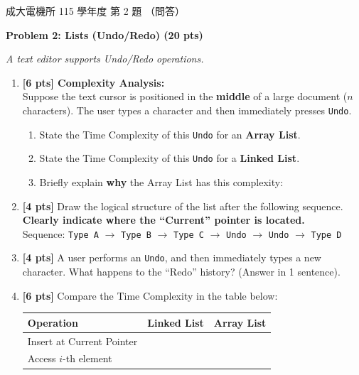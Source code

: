 \begin{pastexam}[label={px:ncku-115-ee-ds-02}]{成大電機所 115 學年度 第 2 題}
（問答）

\textbf{Problem 2: Lists (Undo/Redo) (20 pts)}

\textit{A text editor supports Undo/Redo operations.}
\begin{enumerate}[label=(\alph*)]
\item \textbf{[6 pts] Complexity Analysis:}\\
Suppose the text cursor is positioned in the \textbf{middle} of a large document ($n$ characters).
The user types a character and then immediately presses \texttt{Undo}.
\begin{enumerate}[label=\arabic*.]
\item State the Time Complexity of this \texttt{Undo} for an \textbf{Array List}.
\item State the Time Complexity of this \texttt{Undo} for a \textbf{Linked List}.
\item Briefly explain \textbf{why} the Array List has this complexity:
\end{enumerate}
\item \textbf{[4 pts]} Draw the logical structure of the list after the following sequence.
\textbf{Clearly indicate where the ``Current'' pointer is located.}\\
Sequence: \texttt{Type A} $\rightarrow$ \texttt{Type B} $\rightarrow$ \texttt{Type C} $\rightarrow$
\texttt{Undo} $\rightarrow$ \texttt{Undo} $\rightarrow$ \texttt{Type D}
\item \textbf{[4 pts]} A user performs an \texttt{Undo}, and then immediately types a new character.
What happens to the ``Redo'' history? (Answer in 1 sentence).
\item \textbf{[6 pts]} Compare the Time Complexity in the table below:
\begin{center}
\begin{tabular}{|l|c|c|}
\hline
Operation & Linked List & Array List \\ \hline
Insert at Current Pointer & & \\ \hline
Access $i$-th element & & \\ \hline
\end{tabular}
\end{center}
\end{enumerate}
\end{pastexam}

